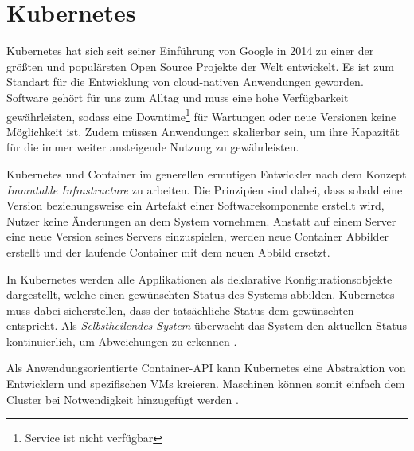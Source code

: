 \section{Kubernetes}
\label{sec:grundlagen:kubernetes}
Kubernetes hat sich seit seiner Einführung von Google in 2014 zu einer der größten und populärsten 
Open Source Projekte der Welt entwickelt. Es ist zum Standart für die Entwicklung von cloud-nativen 
Anwendungen geworden. 
Software gehört für uns zum Alltag und muss eine hohe Verfügbarkeit gewährleisten, sodass eine Downtime\footnote{Service ist nicht verfügbar}
für Wartungen oder neue Versionen keine Möglichkeit ist. 
Zudem müssen Anwendungen skalierbar sein, um ihre Kapazität für die immer weiter ansteigende Nutzung zu gewährleisten.

Kubernetes und Container im generellen ermutigen Entwickler nach dem Konzept \emph{Immutable Infrastructure} zu arbeiten.
Die Prinzipien sind dabei, dass sobald eine Version beziehungsweise ein Artefakt einer Softwarekomponente erstellt wird,
Nutzer keine Änderungen an dem System vornehmen. 
Anstatt auf einem Server eine neue Version seines Servers einzuspielen, werden neue Container Abbilder erstellt 
und der laufende Container mit dem neuen Abbild ersetzt.

In Kubernetes werden alle Applikationen als deklarative Konfigurationsobjekte dargestellt, welche einen gewünschten
Status des Systems abbilden. Kubernetes muss dabei sicherstellen, dass der tatsächliche Status dem gewünschten entspricht.
Als \emph{Selbstheilendes System} überwacht das System den aktuellen Status kontinuierlich, um Abweichungen zu erkennen \cite{Burns2019}.

Als Anwendungsorientierte Container-API kann Kubernetes eine Abstraktion von Entwicklern und spezifischen \acp{VM} kreieren.
Maschinen können somit einfach dem Cluster bei Notwendigkeit hinzugefügt werden \cite{Burns2019}.